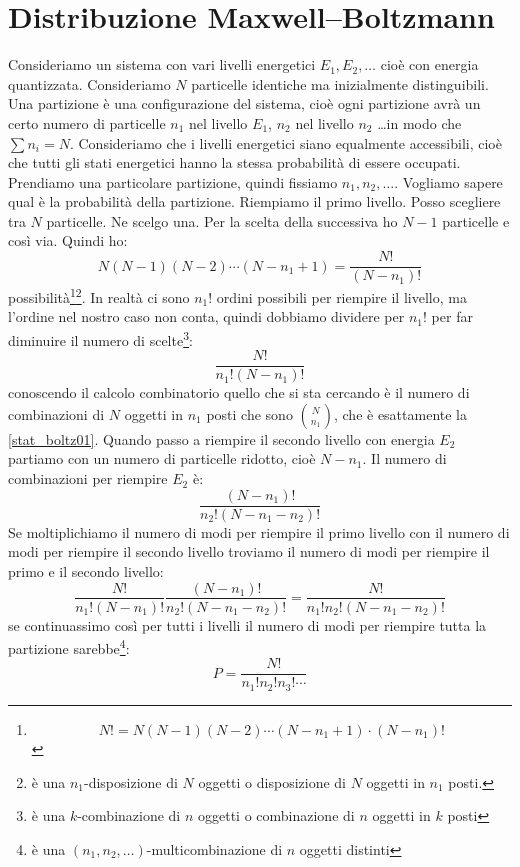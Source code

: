 \section{Distribuzione Maxwell--Boltzmann}
Consideriamo un sistema con vari livelli energetici $E_1, E_2, \ldots$ cioè con energia quantizzata. Consideriamo $N$ particelle identiche ma inizialmente distinguibili. Una partizione è una configurazione del sistema, cioè ogni partizione avrà un certo numero di particelle $n_1$ nel livello $E_1$, $n_2$ nel livello $n_2$ \ldots in modo che $\sum n_i=N$. Consideriamo che i livelli energetici siano equalmente accessibili, cioè che tutti gli stati energetici hanno la stessa probabilità di essere occupati. Prendiamo una particolare partizione, quindi fissiamo $n_1, n_2, \ldots$. Vogliamo sapere qual è la probabilità della partizione. Riempiamo il primo livello. Posso scegliere tra $N$ particelle. Ne scelgo una. Per la scelta della successiva ho $N-1$ particelle e così via. Quindi ho:
\begin{equation}
N(N-1)(N-2)\cdots(N-n_1+1)=\frac{N!}{\left(N-n_1\right)!}
\end{equation}
possibilità\footnote{\[
N!=N(N-1)(N-2)\cdots(N-n_1+1)\cdot(N-n_1)!
\]
}\footnote{è una $n_1$-disposizione di $N$ oggetti o disposizione di $N$ oggetti in $n_1$ posti.}. In realtà ci sono $n_1!$ ordini possibili per riempire il livello, ma l'ordine nel nostro caso non conta, quindi dobbiamo dividere per $n_1!$ per far diminuire il numero di scelte\footnote{è una $k$-combinazione di $n$ oggetti o combinazione di $n$ oggetti in $k$ posti}:
\begin{equation}
\frac{N!}{n_1!(N-n_1)!}
\label{stat_boltz01}
\end{equation}
conoscendo il calcolo combinatorio quello che si sta cercando è il numero di combinazioni di $N$ oggetti in $n_1$ posti che sono $\binom{N}{n_1}$, che è esattamente la \eqref{stat_boltz01}. Quando passo a riempire il secondo livello con energia $E_2$ partiamo con un numero di particelle ridotto, cioè $N-n_1$. Il numero di combinazioni per riempire $E_2$ è:
\begin{equation}
\frac{(N-n_1)!}{n_2!(N-n_1-n_2)!}
\end{equation}
Se moltiplichiamo il numero di modi per riempire il primo livello con il numero di modi per riempire il secondo livello troviamo il numero di modi per riempire il primo e il secondo livello:
\begin{equation}
\frac{N!}{n_1!(N-n_1)!}\frac{(N-n_1)!}{n_2!(N-n_1-n_2)!}=\frac{N!}{n_1!n_2!(N-n_1-n_2)!}
\end{equation}
se continuassimo così per tutti i livelli il numero di modi per riempire tutta la partizione sarebbe\footnote{è una $(n_1,n_2,\ldots)$-multicombinazione di $n$ oggetti distinti}:
\begin{equation}
P=\frac{N!}{n_1!n_2!n_3!\cdots}
\label{stat_001}
\end{equation}

